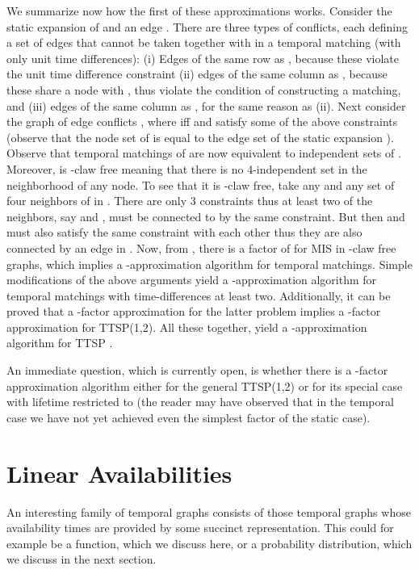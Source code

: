 \documentclass[oribibl, 11pt]{llncs}
\begin{document}
We summarize now how the first of these approximations works. Consider the static expansion  of  and an edge . There are three types of conflicts, each defining a set of edges that cannot be taken together with  in a temporal matching (with only unit time differences): (i) Edges of the same row as , because these violate the unit time difference constraint (ii) edges of the same column as , because these share a node with , thus violate the condition of constructing a matching, and (iii) edges of the same column as , for the same reason as (ii). Next consider the graph of edge conflicts , where  iff  and  satisfy some of the above constraints (observe that the node set of  is equal to the edge set of the static expansion ). Observe that temporal matchings of  are now equivalent to independent sets of . Moreover,  is -claw free meaning that there is no 4-independent set in the neighborhood of any node. To see that it is -claw free, take any  and any set  of four neighbors of  in . There are only 3 constraints thus at least two of the neighbors, say  and , must be connected to  by the same constraint. But then  and  must also satisfy the same constraint with each other thus they are also connected by an edge in . Now, from \cite{Ha95}, there is a factor of  for {\sc MIS} in -claw free graphs, which implies a -approximation algorithm for temporal matchings. Simple modifications of the above arguments yield a -approximation algorithm for temporal matchings with time-differences at least two. Additionally, it can be proved that a -factor approximation for the latter problem implies a -factor approximation for TTSP(1,2). All these together, yield a -approximation algorithm for TTSP \cite{MS14}. 

An immediate question, which is currently open, is whether there is a -factor approximation algorithm either for the general TTSP(1,2) or for its special case with lifetime restricted to  (the reader may have observed that in the temporal case we have not yet achieved even the simplest factor of the static case).

\section{Linear Availabilities}
\label{sec:linear}

An interesting family of temporal graphs consists of those temporal graphs whose availability times are provided by some succinct representation. This could for example be a function, which we discuss here, or a probability distribution, which we discuss in the next section.
\end{document}
